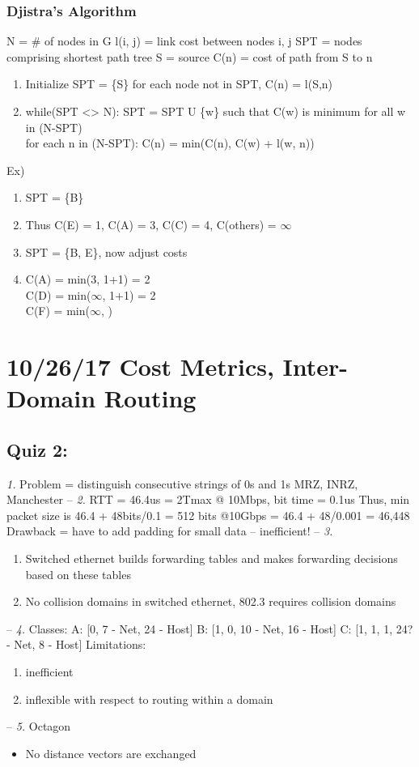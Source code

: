 \documentclass[11pt]{article}
\begin{document}
\subsubsection{Djistra's Algorithm}
\label{sec:orgheadline82}
N = \# of nodes in G
l(i, j) = link cost between nodes i, j
SPT = nodes comprising shortest path tree
S = source
C(n) = cost of path from S to n
\\
\begin{enumerate}
\item Initialize SPT = \{S\}
for each node not in SPT, C(n) = l(S,n)
\item while(SPT <> N):
SPT = SPT U \{w\} such that C(w) is minimum
for all w in (N-SPT)
\\
for each n in (N-SPT):
C(n) = min(C(n), C(w) + l(w, n))
\end{enumerate}

Ex)
\begin{enumerate}
\item SPT = \{B\}
\item Thus C(E) = 1, C(A) = 3, C(C) = 4, C(others) = \(\infty\)
\item SPT = \{B, E\}, now adjust costs
\item C(A) = min(3, 1+1) = 2\\
C(D) = min(\(\infty\), 1+1) = 2\\
C(F) = min(\(\infty\), )
\end{enumerate}

\section{10/26/17  Cost Metrics, Inter-Domain Routing}
\label{sec:orgheadline92}

\subsection{Quiz 2:}
\label{sec:orgheadline85}

\emph{1.}
Problem = distinguish consecutive strings of 0s and 1s
MRZ, INRZ, Manchester
--
\emph{2.}
RTT = 46.4us = 2Tmax
@ 10Mbps, bit time = 0.1us
Thus, min packet size is 46.4 + 48bits/0.1 = 512 bits
@10Gbps = 46.4 + 48/0.001 = 46,448
Drawback = have to add padding for small data -- inefficient!
--
\emph{3.} 
\begin{enumerate}
\item Switched ethernet builds forwarding tables and makes forwarding
decisions based on these tables
\item No collision domains in switched ethernet, 802.3 requires
collision domains
\end{enumerate}
--
\emph{4.} 
Classes:
A: [0, 7 - Net, 24 - Host]
B: [1, 0, 10 - Net, 16 - Host]
C: [1, 1, 1, 24? - Net, 8 - Host]
Limitations:
\begin{enumerate}
\item inefficient
\item inflexible with respect to routing within a domain
\end{enumerate}
--
\emph{5.} 
   Octagon
\begin{itemize}
\item No distance vectors are exchanged
\end{itemize}
\end{document}
